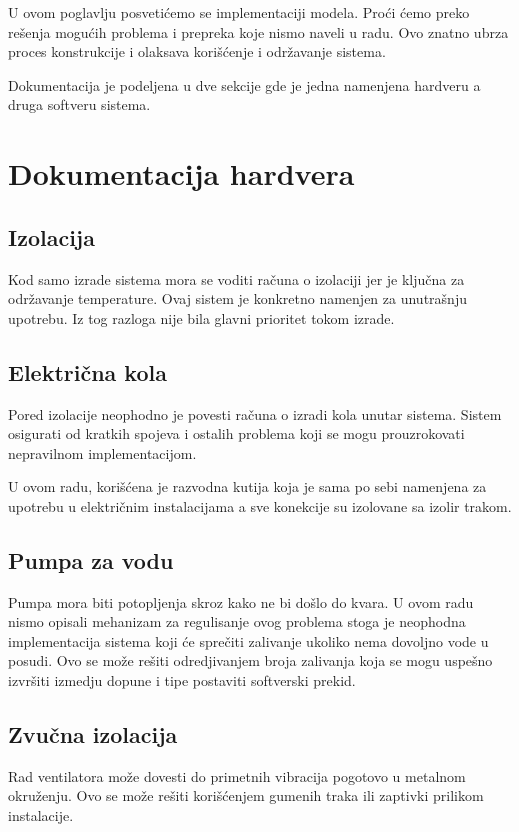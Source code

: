 \documentclass[a4paper,11pt]{book}
\begin{document}
U ovom poglavlju posvetićemo se implementaciji modela. Proći ćemo preko rešenja mogućih problema i prepreka koje nismo naveli u radu. Ovo znatno ubrza proces konstrukcije i olaksava korišćenje i održavanje sistema.

Dokumentacija je podeljena u dve sekcije gde je jedna namenjena hardveru a druga softveru sistema.

\section{Dokumentacija hardvera}

\subsection{Izolacija}
Kod samo izrade sistema mora se voditi računa o izolaciji jer je ključna za održavanje temperature. Ovaj sistem je konkretno namenjen za unutrašnju upotrebu. Iz tog razloga nije bila glavni prioritet tokom izrade.

\subsection{Električna kola}

Pored izolacije neophodno je povesti računa o izradi kola unutar sistema. Sistem osigurati od kratkih spojeva i ostalih problema koji se mogu prouzrokovati nepravilnom implementacijom.

U ovom radu, korišćena je razvodna kutija koja je sama po sebi namenjena za upotrebu u električnim instalacijama a sve konekcije su izolovane sa izolir trakom.

\subsection{Pumpa za vodu}

Pumpa mora biti potopljenja skroz kako ne bi došlo do kvara. U ovom radu nismo opisali mehanizam za regulisanje ovog problema stoga je neophodna implementacija sistema koji će sprečiti zalivanje ukoliko nema dovoljno vode u posudi. Ovo se može rešiti odredjivanjem broja zalivanja koja se mogu uspešno izvršiti izmedju dopune i tipe postaviti softverski prekid.

\subsection{Zvučna izolacija}

Rad ventilatora može dovesti do primetnih vibracija pogotovo u metalnom okruženju. Ovo se može rešiti korišćenjem gumenih traka ili zaptivki prilikom instalacije.
\end{document}
